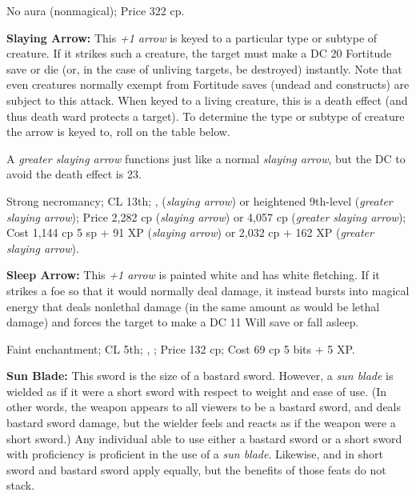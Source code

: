 No aura (nonmagical); Price 322 cp.

\textbf{Slaying Arrow:} This \emph{+1 arrow} is keyed to a particular type or subtype of creature. If it strikes such a creature, the target must make a DC 20 Fortitude save or die (or, in the case of unliving targets, be destroyed) instantly. Note that even creatures normally exempt from Fortitude saves (undead and constructs) are subject to this attack. When keyed to a living creature, this is a death effect (and thus death ward protects a target). To determine the type or subtype of creature the arrow is keyed to, roll on the table below.

A \emph{greater slaying arrow} functions just like a normal \emph{slaying arrow}, but the DC to avoid the death effect is 23.

Strong necromancy; CL 13th; ,  (\emph{slaying arrow}) or heightened 9th-level  (\emph{greater slaying arrow}); Price 2,282 cp (\emph{slaying arrow}) or 4,057 cp (\emph{greater slaying arrow}); Cost 1,144 cp 5 sp + 91 XP (\emph{slaying arrow}) or 2,032 cp + 162 XP (\emph{greater slaying arrow}).


\textbf{Sleep Arrow:} This \emph{+1 arrow} is painted white and has white fletching. If it strikes a foe so that it would normally deal damage, it instead bursts into magical energy that deals nonlethal damage (in the same amount as would be lethal damage) and forces the target to make a DC 11 Will save or fall asleep.

Faint enchantment; CL 5th; , ; Price 132 cp; Cost 69 cp 5 bits + 5 XP.

\textbf{Sun Blade:} This sword is the size of a bastard sword. However, a \emph{sun blade} is wielded as if it were a short sword with respect to weight and ease of use. (In other words, the weapon appears to all viewers to be a bastard sword, and deals bastard sword damage, but the wielder feels and reacts as if the weapon were a short sword.) Any individual able to use either a bastard sword or a short sword with proficiency is proficient in the use of a \emph{sun blade}. Likewise,  and  in short sword and bastard sword apply equally, but the benefits of those feats do not stack.

